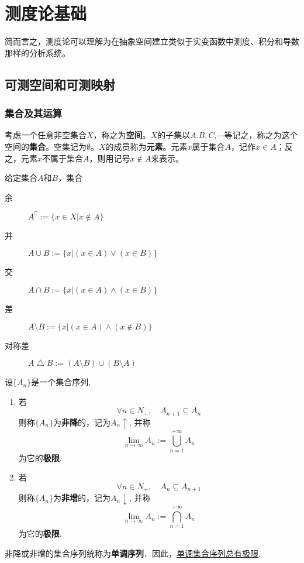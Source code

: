 \chapter{测度论基础}

简而言之，测度论可以理解为在抽象空间建立类似于实变函数中测度、积分和导数那样的分析系统。

\section{可测空间和可测映射}

\subsection{集合及其运算}

考虑一个任意非空集合$X$，称之为\textbf{空间}。$X$的子集以$A.B,C,\cdots $等记之，称之为这个空间的\textbf{集合}。空集记为$\emptyset$。$X$的成员称为\textbf{元素}。元素$x$属于集合$A$，记作$x \in A$；反之，元素$x$不属于集合$A$，则用记号$x \notin A$来表示。

\begin{definition}[集合的运算]
    给定集合$A$和$B$，集合
    \begin{description}
        \item[余] $A^{\complement} := \{ x \in X | x \notin A \}$
        \item[并] $A \cup B := \{ x | (x \in A)\vee(x \in B) \}$
        \item[交] $A \cap B := \{ x | (x \in A)\wedge(x \in B) \}$
        \item[差] $A \setminus B := \{ x | (x \in A)\wedge(x \notin B) \}$
        \item[对称差] $A \bigtriangleup B := (A \setminus B)\cup (B \setminus A)$
    \end{description}
\end{definition}

\begin{definition}[集合的极限]
    设$\{ A_n \}$是一个集合序列,
    \begin{enumerate}
        \item 若
              \[ \forall n \in N_+ ,\quad A_{n+1} \subseteq A_n \]
              则称$\{ A_n \}$为\textbf{非降}的，记为$A_n\uparrow$, 并称
              \[ \lim_{n \to \infty}A_n := \bigcup_{n=1}^{+\infty}A_n \]
              为它的\textbf{极限}.
        \item 若
              \[ \forall n \in N_+ ,\quad A_{n} \subseteq A_{n+1} \]
              则称$\{ A_n \}$为\textbf{非增}的，记为$A_n\downarrow$, 并称
              \[ \lim_{n \to \infty}A_n := \bigcap_{n=1}^{+\infty}A_n \]
              为它的\textbf{极限}.
    \end{enumerate}
    非降或非增的集合序列统称为\textbf{单调序列}．因此，\underline{单调集合序列总有极限}.
\end{definition}

